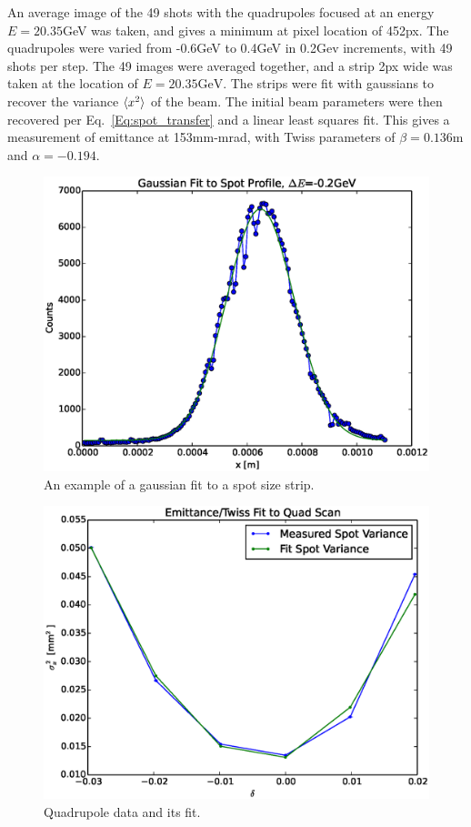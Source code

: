 \documentclass[aps,prl,twocolumn,groupedaddress]{revtex4}
\begin{document}
An average image of the 49 shots with the quadrupoles focused at an energy $E=20.35$GeV was taken, and gives a minimum at pixel location of 452px.  The quadrupoles were varied from -0.6GeV to 0.4GeV in 0.2Gev increments, with 49 shots per step.  The 49 images were averaged together, and a strip 2px wide was taken at the location of $E=20.35\text{GeV}$.  The strips were fit with gaussians to recover the variance $\langle x^2 \rangle$ of the beam.  The initial beam parameters were then recovered per Eq.~\ref{Eq:spot_transfer} and a linear least squares fit.  This gives a measurement of emittance at 153mm-mrad, with Twiss parameters of $\beta=0.136\text{m}$ and $\alpha=-0.194$.
\begin{figure}
	\includegraphics[scale=0.4]{gauss_fit_routine.eps}
	\caption{An example of a gaussian fit to a spot size strip.}
	\label{fig:gaussfit}
\end{figure}
\begin{figure}[]
	\includegraphics[scale=0.4]{quadscanfit.eps}
	\caption{Quadrupole data and its fit.}
	\label{fig:quadscanfit}
\end{figure}
\end{document}

